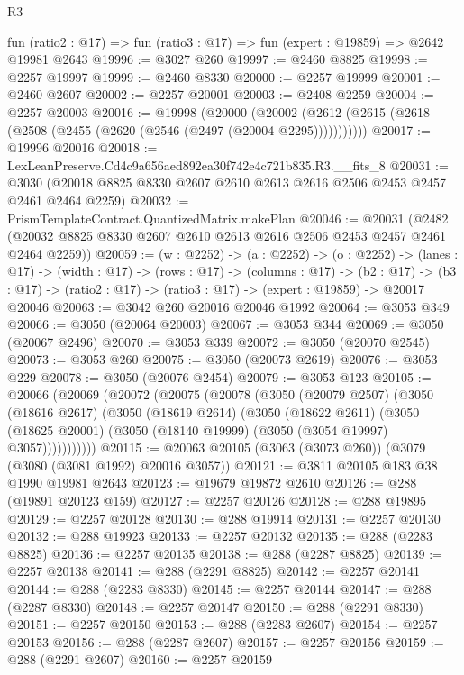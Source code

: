 \begin{lexlean}{R3}
\begin{coremodule}
  fun (ratio2 : @17) => fun (ratio3 : @17) => fun (expert : @19859) => @2642 @19981 @2643
@19996 := @3027 @260
@19997 := @2460 @8825
@19998 := @2257 @19997
@19999 := @2460 @8330
@20000 := @2257 @19999
@20001 := @2460 @2607
@20002 := @2257 @20001
@20003 := @2408 @2259
@20004 := @2257 @20003
@20016 := @19998
    (@20000 (@20002 (@2612 (@2615 (@2618 (@2508 (@2455 (@2620 (@2546 (@2497 (@20004 @2295)))))))))))
@20017 := @19996 @20016
@20018 := LexLeanPreserve.Cd4c9a656aed892ea30f742e4c721b835.R3.__fits_8
@20031 := @3030 (@20018 @8825 @8330 @2607 @2610 @2613 @2616 @2506 @2453 @2457 @2461 @2464 @2259)
@20032 := PrismTemplateContract.QuantizedMatrix.makePlan
@20046 := @20031
    (@2482 (@20032 @8825 @8330 @2607 @2610 @2613 @2616 @2506 @2453 @2457 @2461 @2464 @2259))
@20059 := (w : @2252) ->
  (a : @2252) ->
  (o : @2252) ->
  (lanes : @17) ->
  (width : @17) ->
  (rows : @17) ->
  (columns : @17) ->
  (b2 : @17) -> (b3 : @17) -> (ratio2 : @17) -> (ratio3 : @17) -> (expert : @19859) -> @20017 @20046
@20063 := @3042 @260 @20016 @20046 @1992
@20064 := @3053 @349
@20066 := @3050 (@20064 @20003)
@20067 := @3053 @344
@20069 := @3050 (@20067 @2496)
@20070 := @3053 @339
@20072 := @3050 (@20070 @2545)
@20073 := @3053 @260
@20075 := @3050 (@20073 @2619)
@20076 := @3053 @229
@20078 := @3050 (@20076 @2454)
@20079 := @3053 @123
@20105 := @20066
    (@20069
      (@20072
        (@20075
          (@20078
            (@3050
              (@20079 @2507)
              (@3050
                (@18616 @2617)
                (@3050
                  (@18619 @2614)
                  (@3050
                    (@18622 @2611)
                    (@3050
                      (@18625 @20001)
                      (@3050 (@18140 @19999) (@3050 (@3054 @19997) @3057)))))))))))
@20115 := @20063 @20105 (@3063 (@3073 @260)) (@3079 (@3080 (@3081 @1992) @20016 @3057))
@20121 := @3811 @20105 @183 @38 @1990 @19981 @2643
@20123 := @19679 @19872 @2610
@20126 := @288 (@19891 @20123 @159)
@20127 := @2257 @20126
@20128 := @288 @19895
@20129 := @2257 @20128
@20130 := @288 @19914
@20131 := @2257 @20130
@20132 := @288 @19923
@20133 := @2257 @20132
@20135 := @288 (@2283 @8825)
@20136 := @2257 @20135
@20138 := @288 (@2287 @8825)
@20139 := @2257 @20138
@20141 := @288 (@2291 @8825)
@20142 := @2257 @20141
@20144 := @288 (@2283 @8330)
@20145 := @2257 @20144
@20147 := @288 (@2287 @8330)
@20148 := @2257 @20147
@20150 := @288 (@2291 @8330)
@20151 := @2257 @20150
@20153 := @288 (@2283 @2607)
@20154 := @2257 @20153
@20156 := @288 (@2287 @2607)
@20157 := @2257 @20156
@20159 := @288 (@2291 @2607)
@20160 := @2257 @20159

\end{coremodule}
\end{lexlean}
